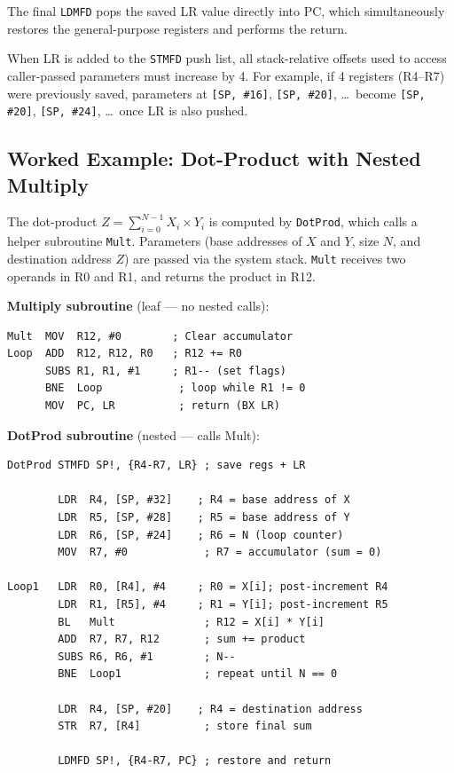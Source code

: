 \documentclass[11pt, a4paper, notitlepage]{report}
\theoremstyle{definition}
\theoremstyle{remark}
\theoremstyle{definition}
\begin{document}
The final \texttt{LDMFD} pops the saved LR value directly into PC, which simultaneously restores the general-purpose registers and performs the return.

\begin{keyresult}[title={Stack Offset Adjustment When Saving LR}]
When LR is added to the \texttt{STMFD} push list, all stack-relative offsets used to access caller-passed parameters must increase by 4. For example, if 4 registers (R4--R7) were previously saved, parameters at \texttt{[SP, \#16]}, \texttt{[SP, \#20]}, \ldots\ become \texttt{[SP, \#20]}, \texttt{[SP, \#24]}, \ldots\ once LR is also pushed.
\end{keyresult}

\subsection{Worked Example: Dot-Product with Nested Multiply}

The dot-product $Z = \sum_{i=0}^{N-1} X_i \times Y_i$ is computed by \texttt{DotProd}, which calls a helper subroutine \texttt{Mult}. Parameters (base addresses of $X$ and $Y$, size $N$, and destination address $Z$) are passed via the system stack. \texttt{Mult} receives two operands in R0 and R1, and returns the product in R12.

\textbf{Multiply subroutine} (leaf --- no nested calls):

\begin{lstlisting}
Mult  MOV  R12, #0        ; Clear accumulator
Loop  ADD  R12, R12, R0   ; R12 += R0
      SUBS R1, R1, #1     ; R1-- (set flags)
      BNE  Loop            ; loop while R1 != 0
      MOV  PC, LR          ; return (BX LR)
\end{lstlisting}

\textbf{DotProd subroutine} (nested --- calls Mult):

\begin{lstlisting}
DotProd STMFD SP!, {R4-R7, LR} ; save regs + LR

        LDR  R4, [SP, #32]    ; R4 = base address of X
        LDR  R5, [SP, #28]    ; R5 = base address of Y
        LDR  R6, [SP, #24]    ; R6 = N (loop counter)
        MOV  R7, #0            ; R7 = accumulator (sum = 0)

Loop1   LDR  R0, [R4], #4     ; R0 = X[i]; post-increment R4
        LDR  R1, [R5], #4     ; R1 = Y[i]; post-increment R5
        BL   Mult              ; R12 = X[i] * Y[i]
        ADD  R7, R7, R12       ; sum += product
        SUBS R6, R6, #1        ; N--
        BNE  Loop1             ; repeat until N == 0

        LDR  R4, [SP, #20]    ; R4 = destination address
        STR  R7, [R4]          ; store final sum

        LDMFD SP!, {R4-R7, PC} ; restore and return
\end{lstlisting}
\end{document}

